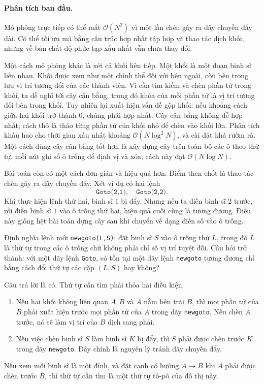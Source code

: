 \documentclass[11pt]{article}
\newcommand{\Oh}{\mathcal{O}}
\begin{document}
\paragraph{Phân tích ban đầu.}
Mô phỏng trực tiếp có thể mất $\Oh(N^2)$ vì một lần chèn gây ra dây chuyền
đẩy dài. Có thể tối ưu mã bằng cấu trúc hợp nhất tập hợp và thao tác dịch
khối, nhưng về bản chất độ phức tạp xấu nhất vẫn chưa thay đổi.

Một cách mô phỏng khác là xét cả khối liên tiếp. Một khối là một đoạn binh sĩ
liền nhau. Khối được xem như một chỉnh thể đối với bên ngoài, còn bên trong
lưu vị trí tương đối của các thành viên. Vì cần tìm kiếm và chèn phần tử trong
khối, ta dễ nghĩ tới cây cân bằng, trong đó khóa của mỗi phần tử là vị trí
tương đối bên trong khối. Tuy nhiên lại xuất hiện vấn đề gộp khối: nếu khoảng
cách giữa hai khối trở thành $0$, chúng phải hợp nhất. Cây cân bằng không dễ
hợp nhất; cách thô là tháo từng phần tử của khối nhỏ để chèn vào khối lớn.
Phân tích khấu hao cho thời gian xấu nhất khoảng $\Oh(N\log^2 N)$, và cài đặt
khá rườm rà. Một cách dùng cây cân bằng tốt hơn là xây dựng cây trên toàn bộ
các ô theo thứ tự, mỗi nút ghi số ô trống để định vị và xóa; cách này đạt
$\Oh(N\log N)$.

Bài toán còn có một cách đơn giản và hiệu quả hơn. Điểm then chốt là thao tác
chèn gây ra dây chuyền đẩy. Xét ví dụ có hai lệnh
\[
  \texttt{Goto(2,1)},\quad \texttt{Goto(2,2)}.
\]
Khi thực hiện lệnh thứ hai, binh sĩ $1$ bị đẩy. Nhưng nếu ta điền binh sĩ
$2$ trước, rồi điền binh sĩ $1$ vào ô trống thứ hai, hiệu quả cuối cùng là
tương đương. Điều này giống hệt bài toán dựng cây sau khi chuyển về dạng điền
số vào ô trống.

Định nghĩa lệnh mới \texttt{newgoto(L,S)}: đặt binh sĩ $S$ vào ô trống thứ
$L$, trong đó $L$ là thứ tự trong các ô trống chứ không phải chỉ số vị trí
tuyệt đối. Câu hỏi trở thành: với một dãy lệnh \texttt{Goto}, có tồn tại một
dãy lệnh \texttt{newgoto} tương đương chỉ bằng cách đổi thứ tự các cặp
$(L,S)$ hay không?

Câu trả lời là có. Thứ tự cần tìm phải thỏa hai điều kiện:
\begin{enumerate}
  \item Nếu hai khối không liên quan $A,B$ và $A$ nằm bên trái $B$, thì mọi
  phần tử của $B$ phải xuất hiện trước mọi phần tử của $A$ trong dãy
  \texttt{newgoto}. Nếu chèn $A$ trước, nó sẽ làm vị trí của $B$ dịch sang
  phải.
  \item Nếu việc chèn binh sĩ $S$ làm binh sĩ $K$ bị đẩy, thì $S$ phải được
  chèn trước $K$ trong dãy \texttt{newgoto}. Đây chính là nguyên lý tránh dây
  chuyền đẩy.
\end{enumerate}
Nếu xem mỗi binh sĩ là một đỉnh, và đặt cạnh có hướng $A\to B$ khi $A$ phải
được chèn trước $B$, thì thứ tự cần tìm là một thứ tự tô-pô của đồ thị này.
\end{document}
